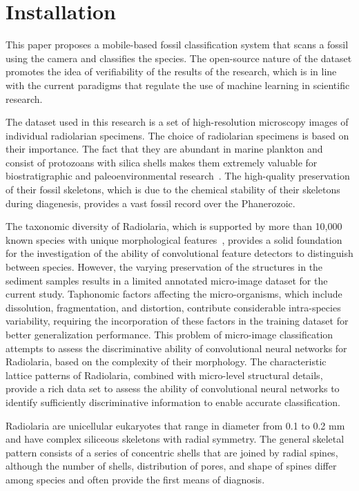\documentclass[a4paper,fleqn]{cas-sc}
\begin{document}
\FloatBarrier

\section{Installation}

This paper proposes a mobile-based fossil classification system that scans a fossil using the camera and classifies the species. The open-source nature of the dataset promotes the idea of verifiability of the results of the research, which is in line with the current paradigms that regulate the use of machine learning in scientific research.

The dataset used in this research is a set of high-resolution microscopy images of individual radiolarian specimens. The choice of radiolarian specimens is based on their importance. The fact that they are abundant in marine plankton and consist of protozoans with silica shells makes them extremely valuable for biostratigraphic and paleoenvironmental research~\cite{brombacher2020radiolarian}. The high-quality preservation of their fossil skeletons, which is due to the chemical stability of their skeletons during diagenesis, provides a vast fossil record over the Phanerozoic.

The taxonomic diversity of Radiolaria, which is supported by more than 10,000 known species with unique morphological features~\cite{brombacher2020radiolarian}, provides a solid foundation for the investigation of the ability of convolutional feature detectors to distinguish between species. However, the varying preservation of the structures in the sediment samples results in a limited annotated micro-image dataset for the current study. Taphonomic factors affecting the micro-organisms, which include dissolution, fragmentation, and distortion, contribute considerable intra-species variability, requiring the incorporation of these factors in the training dataset for better generalization performance. This problem of micro-image classification attempts to assess the discriminative ability of convolutional neural networks for Radiolaria, based on the complexity of their morphology. The characteristic lattice patterns of Radiolaria, combined with micro-level structural details, provide a rich data set to assess the ability of convolutional neural networks to identify sufficiently discriminative information to enable accurate classification.

Radiolaria are unicellular eukaryotes that range in diameter from 0.1 to 0.2 mm and have complex siliceous skeletons with radial symmetry. The general skeletal pattern consists of a series of concentric shells that are joined by radial spines, although the number of shells, distribution of pores, and shape of spines differ among species and often provide the first means of diagnosis.
\end{document}
